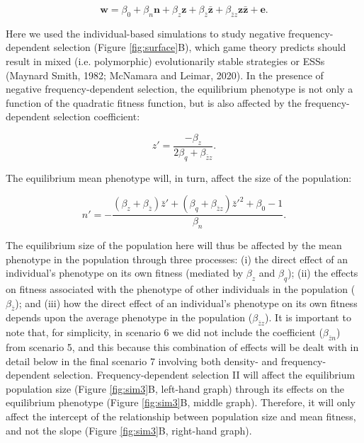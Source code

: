 \documentclass{article}
\begin{document}
\begin{equation} \label{eq: FDS}
\mathbf{w}=\beta_{0} +\beta_{n} \mathbf{n} + \beta_{z} \mathbf{z}+ \beta_{\bar{z}} \mathbf{\bar{z}}  + \beta_{\bar{z}z} \mathbf{z\bar{z}}  +  \mathbf{e}.
\end{equation}

\noindent Here we used the individual-based simulations to study negative frequency-dependent selection (Figure \ref{fig:surface}B), which game theory predicts should result in mixed (i.e. polymorphic) evolutionarily stable strategies or ESSs (Maynard Smith, 1982; McNamara and Leimar, 2020). In the presence of negative frequency-dependent selection, the equilibrium phenotype is not only a function of the quadratic fitness function, but is also affected by the frequency-dependent selection coefficient:

\begin{equation} 
z'=\frac{-\beta_{z}}{2\beta_{q} + \beta_{\bar{z}z}}.
\end{equation} 

\noindent The equilibrium mean phenotype will, in turn, affect the size of the population:

\begin{equation}
n' = -\frac{(\beta_{z}   + \beta_{\bar{z}})\bar{z}' + (\beta_{q} + \beta_{\bar{z}z})\bar{z}'^2+\beta_{0} -1}{\beta_{n}}.
\end{equation}

\noindent The equilibrium size of the population here will thus be affected by the mean phenotype in the population through three processes: (i) the direct effect of an individual's phenotype on its own fitness (mediated by $\beta_z$ and $ \beta_q$); (ii) the effects on fitness associated with the phenotype of other individuals in the population ($\beta_{\bar{z}}$); and (iii) how the direct effect of an individual's phenotype on its own fitness depends upon the average phenotype in the population ($\beta_{\bar{z}z}$). It is important to note that, for simplicity, in scenario 6 we did not include the coefficient ($\beta_{\bar{z}n}$) from scenario 5, and this because this combination of effects will be dealt with in detail below in the final scenario 7 involving both density- and frequency-dependent selection. Frequency-dependent selection II will affect the equilibrium population size (Figure \ref{fig:sim3}B, left-hand graph) through its effects on the equilibrium phenotype (Figure \ref{fig:sim3}B, middle graph). Therefore, it will only affect the intercept of the relationship between population size and mean fitness, and not the slope (Figure \ref{fig:sim3}B, right-hand graph).
 
\end{document}
